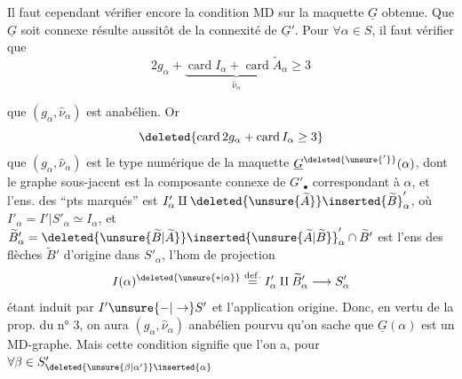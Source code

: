 Il faut cependant vérifier encore la condition MD sur la maquette $\underline G$ obtenue. Que $\underline G$ soit connexe résulte aussitôt de la connexité de $\underline G'$. Pour $\forall\alpha\in S$, il faut vérifier que
\[
2g_\alpha+\underbrace{\operatorname{card}I_\alpha+\operatorname{card}\widetilde A_\alpha}_{\widehat\nu_\alpha}\geq3
\]

 que $(g_\alpha,\widehat\nu_\alpha)$ est anabélien. Or
\[
\deleted{\operatorname{card}2g_\alpha+\operatorname{card}I_\alpha\geq3}
\]
 que $(g_\alpha,\widehat\nu_\alpha)$ est le type numérique de la maquette $\underline G^{\deleted{\unsure{'}}}(\alpha)$, dont le graphe sous-jacent est la composante connexe de $G'_\bullet$ correspondant à $\alpha$, et l'ens. des ``pts marqués'' est $I'_\alpha\amalg\deleted{\unsure{\widetilde A}}\inserted{\widetilde B}'_\alpha$,  où $I'_\alpha=I'|S'_\alpha\simeq I_\alpha$, et $\widetilde B'_\alpha=\deleted{\unsure{\widetilde B|\widetilde A}}\inserted{\unsure{\widetilde A|\widetilde B}}'_\alpha\cap\widetilde B'$ est l'ens des flèches  $\widetilde B'$ d'origine dans $S'_\alpha$, l'hom de projection
\[
I(\alpha)^{\deleted{\unsure{\ast|\alpha}}}\overset{\mathrm{def.}}{=}I'_\alpha\amalg\widetilde B'_\alpha\longrightarrow S'_\alpha
\]
étant induit par $I'\unsure{{-}|\to}S'$ et l'application origine. Donc, en vertu de la prop. du n° 3, on aura $(g_\alpha,\widehat\nu_\alpha)$ anabélien pourvu qu'on sache que $\underline G(\alpha)$ est un MD-graphe. Mais cette condition signifie que l'on a, pour $\forall\beta\in S'_{\deleted{\unsure{\beta|\alpha'}}\inserted{\alpha}}$
